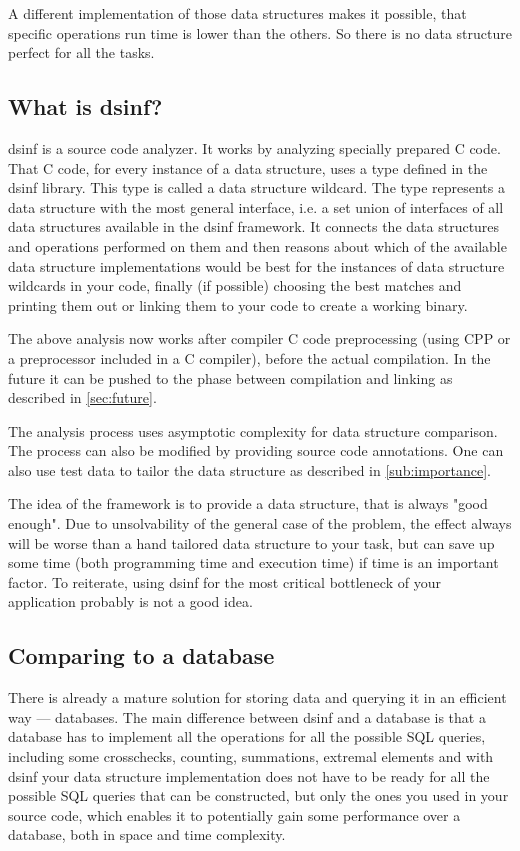 \documentclass[a4paper,11pt]{article}
\begin{document}
	A different implementation of those data structures makes it possible, that specific operations run time is
	lower than the others. So there is no data structure perfect for all the tasks.

	\subsection{What is dsinf?} \label{sub:intro}

		dsinf is a source code analyzer. It works by analyzing specially prepared C code. That C code, for every
		instance of a data structure, uses a type defined in the dsinf library. This type is called a data
		structure wildcard. The type represents a data structure with the most general interface, i.e. a set union
		of interfaces of all data structures available in the dsinf framework. It connects the data structures
		and operations performed on them and then reasons about which of the available data structure
		implementations would be best for the instances of data structure wildcards in your code, finally (if
		possible) choosing the best matches and printing them out or linking them to your code to create a
		working binary.

		The above analysis now works after compiler C code preprocessing (using CPP or a preprocessor included in a C compiler), before the actual compilation. In the future it can be
		pushed to the phase between compilation and linking as described in \autoref{sec:future}.

		The analysis process uses asymptotic complexity for data structure comparison. The process can also be
		modified by providing source code annotations. One can also use test data to tailor the data
		structure as described in \autoref{sub:importance}.

		The idea of the framework is to provide a data structure, that is always "good enough". Due to
		unsolvability of the general case of the problem, the effect always will be worse than a hand tailored
		data structure to your task, but can save up some time (both programming time and execution time) if
        time is an important factor. To reiterate, using dsinf for the most critical bottleneck of your
		application probably is not a good idea.

	\subsection{Comparing to a database} \label{sub:database}
        There is already a mature solution for storing data and querying it in an efficient way --- databases.
		The main difference between dsinf and a database is that a database has to implement all the operations
		for all the possible SQL queries, including some crosschecks, counting, summations, extremal elements
		and with dsinf your data structure implementation does not have to be ready for all the possible SQL
		queries that can be constructed, but only the ones you used in your source code, which enables it to
		potentially gain some performance over a database, both in space and time complexity.
\end{document}
